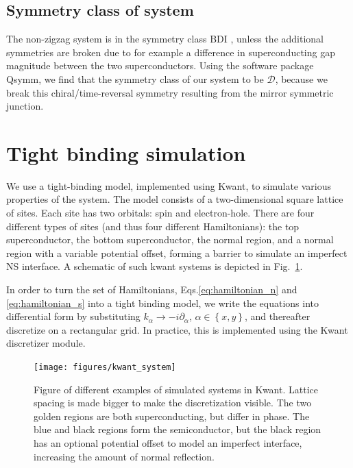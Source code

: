\subsection{Symmetry class of system}
	The non-zigzag system is in the symmetry class BDI \cite{pientka2017topological}, unless the additional symmetries are broken due to for example a difference in superconducting gap magnitude between the two superconductors.
	Using the software package Qsymm\cite{varjas2018qsymm}, we find that the symmetry class of our system to be $\mathcal{D}$, because we break this chiral/time-reversal symmetry resulting from the mirror symmetric junction.


\section{Tight binding simulation}

	We use a tight-binding model, implemented using Kwant, to simulate various properties of the system.
	The model consists of a two-dimensional square lattice of sites.
	Each site has two orbitals: spin and electron-hole.
	There are four different types of sites (and thus four different Hamiltonians): the top superconductor, the bottom superconductor, the normal region, and a normal region with a variable potential offset, forming a barrier to simulate an imperfect NS interface.
	A schematic of such kwant systems is depicted in Fig.~\ref{fig:kwant_system}.

	In order to turn the set of Hamiltonians, Eqs.\eqref{eq:hamiltonian_n} and \eqref{eq:hamiltonian_s} into a tight binding model, we write the equations into differential form by substituting $k_\alpha \rightarrow - i \partial_\alpha$, $\alpha \in \left\{ x, y \right\}$, and thereafter discretize on a rectangular grid.
	In practice, this is implemented using the Kwant discretizer module.


	\begin{figure}[!htb]
	\centering
	\texttt{[image: figures/kwant\_system]}
	\caption{Figure of different examples of simulated systems in Kwant.
	Lattice spacing is made bigger to make the discretization visible.
	The two golden regions are both superconducting, but differ in phase.
	The blue and black regions form the semiconductor, but the black region has an optional potential offset to model an imperfect interface, increasing the amount of normal reflection.}
	\label{fig:kwant_system}
	\end{figure}


